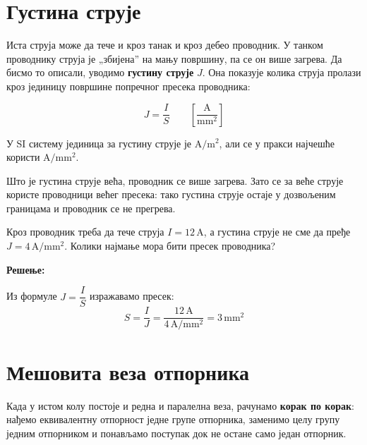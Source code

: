 \documentclass[12pt]{article}
\begin{document}
\section{Густина струје}

Иста струја може да тече и кроз танак и кроз дебео проводник. У танком
проводнику струја је „збијена” на мању површину, па се он више загрева. Да
бисмо то описали, уводимо \textbf{густину струје} $J$. Она показује колика
струја пролази кроз јединицу површине попречног пресека проводника:

\begin{kljucno}
\[
J = \frac{I}{S} \qquad \left[\frac{\text{A}}{\text{mm}^2}\right]
\]
\end{kljucno}

У SI систему јединица за густину струје је $\text{A}/\text{m}^2$, али се у
пракси најчешће користи $\text{A}/\text{mm}^2$.

Што је густина струје већа, проводник се више загрева. Зато се за веће струје
користе проводници већег пресека: тако густина струје остаје у дозвољеним
границама и проводник се не прегрева.

\begin{primer}
Кроз проводник треба да тече струја $I = 12\,\text{A}$, а густина струје не
сме да пређе $J = 4\,\text{A}/\text{mm}^2$. Колики најмање мора бити пресек
проводника?

\textbf{Решење:}

Из формуле $J = \dfrac{I}{S}$ изражавамо пресек:
\[
S = \frac{I}{J} = \frac{12\,\text{A}}{4\,\text{A}/\text{mm}^2} = 3\,\text{mm}^2
\]
\end{primer}

\section{Мешовита веза отпорника}

Када у истом колу постоје и редна и паралелна веза, рачунамо \textbf{корак по
корак}: нађемо еквивалентну отпорност једне групе отпорника, заменимо целу
групу једним отпорником и понављамо поступак док не остане само један
отпорник.
\end{document}
